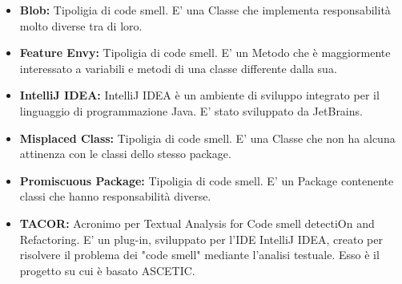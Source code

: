 
	   		
\begin{itemize}
	   			
	   			\item \textbf{Blob:} Tipoligia di code smell. E' una Classe che implementa responsabilità molto diverse tra di loro.
	   			
	   			\item \textbf{Feature Envy:} Tipoligia di code smell. E' un Metodo che è maggiormente interessato a variabili e metodi di una classe differente dalla sua.
	   			
	   			\item \textbf{IntelliJ IDEA:} IntelliJ IDEA è un ambiente di sviluppo integrato per il linguaggio di programmazione Java. E' stato sviluppato da JetBrains.
	   			
	   			\item \textbf{Misplaced Class:} Tipoligia di code smell. E' una Classe che non ha alcuna attinenza con le classi dello stesso package.
	   			
	   			\item \textbf{Promiscuous Package:} Tipoligia di code smell. E' un Package contenente classi che hanno responsabilità diverse.
	   			
	   			\item \textbf{TACOR:} Acronimo per Textual Analysis for Code smell detectiOn and Refactoring. E' un plug-in, sviluppato per l'IDE IntelliJ IDEA, creato per risolvere il problema dei "code smell" mediante l'analisi testuale. Esso è il progetto su cui è basato ASCETIC.
	   			
\end{itemize}
